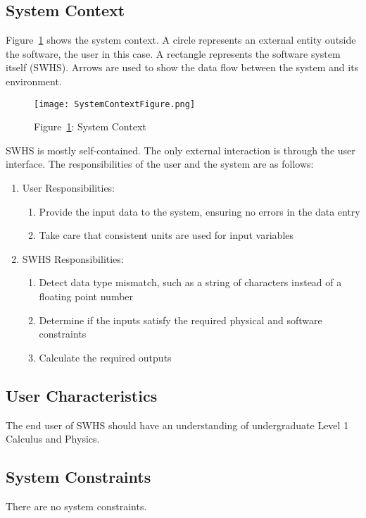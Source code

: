 \documentclass[12pt]{article}
\begin{document}
\subsection{System Context}
\label{Sec:SysContext}
Figure~\ref{Figure:SysCon} shows the system context. A circle represents an external entity outside the software, the user in this case. A rectangle represents the software system itself (SWHS). Arrows are used to show the data flow between the system and its environment.
\begin{figure}
\begin{center}
\texttt{[image: SystemContextFigure.png]}
\caption{Figure~\ref{Figure:SysCon}: System Context}
\label{Figure:SysCon}
\end{center}
\end{figure}
SWHS is mostly self-contained. The only external interaction is through the user interface. The responsibilities of the user and the system are as follows:
\begin{enumerate}
\item{User Responsibilities:}
\begin{enumerate}
\item{Provide the input data to the system, ensuring no errors in the data entry}
\item{Take care that consistent units are used for input variables}
\end{enumerate}
\item{SWHS Responsibilities:}
\begin{enumerate}
\item{Detect data type mismatch, such as a string of characters instead of a floating point number}
\item{Determine if the inputs satisfy the required physical and software constraints}
\item{Calculate the required outputs}
\end{enumerate}
\end{enumerate}
\subsection{User Characteristics}
\label{Sec:UserChars}
The end user of SWHS should have an understanding of undergraduate Level 1 Calculus and Physics.
\subsection{System Constraints}
\label{Sec:SysConstraints}
There are no system constraints.
\end{document}
